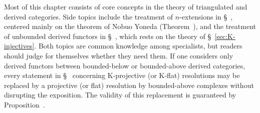 \begin{wenxintishi}
	Most of this chapter consists of core concepts in the theory of
	triangulated and derived categories. Side topics include the treatment of
	$n$-extensions in \S~, centered mainly
	on the theorem of Nobuo Yoneda
	(Theorem~), and the treatment
	of unbounded derived functors in
	\S~, which rests on the theory
	of \S~\ref{sec:K-injectives}. Both topics are common knowledge among
	specialists, but readers should judge for themselves whether they need
	them. If one considers only derived functors between bounded-below or
	bounded-above derived categories, every statement in
	\S~ concerning K-projective (or K-flat)
	resolutions may be replaced by a projective (or flat) resolution by
	bounded-above complexes without disrupting the exposition. The validity
	of this replacement is guaranteed by
	Proposition~.
\end{wenxintishi}
